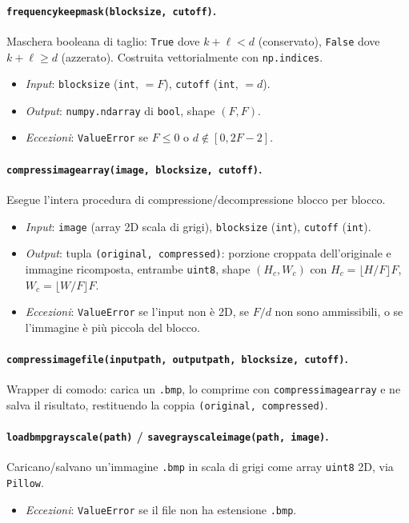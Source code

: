 \documentclass[11pt,a4paper]{article}
\makeatletter
\let\@origtexttt\texttt
\renewcommand{\texttt}[1]{{\def\_{\textunderscore\discretionary{}{}{}}\@origtexttt{#1}}}
\makeatother
\begin{document}
\paragraph{\texttt{frequency\_keep\_mask(block\_size, cutoff)}.}
Maschera booleana di taglio: \texttt{True} dove $k+\ell<d$ (conservato),
\texttt{False} dove $k+\ell\ge d$ (azzerato). Costruita vettorialmente con
\texttt{np.indices}.
\begin{itemize}
  \item \emph{Input}: \texttt{block\_size} (\texttt{int}, $=F$), \texttt{cutoff}
        (\texttt{int}, $=d$).
  \item \emph{Output}: \texttt{numpy.ndarray} di \texttt{bool}, shape $(F,F)$.
  \item \emph{Eccezioni}: \texttt{ValueError} se $F\le 0$ o $d\notin[0,2F-2]$.
\end{itemize}

\paragraph{\texttt{compress\_image\_array(image, block\_size, cutoff)}.}
Esegue l'intera procedura di compressione/decompressione blocco per blocco.
\begin{itemize}
  \item \emph{Input}: \texttt{image} (array 2D scala di grigi), \texttt{block\_size}
        (\texttt{int}), \texttt{cutoff} (\texttt{int}).
  \item \emph{Output}: tupla \texttt{(original, compressed)}: porzione
        croppata dell'originale e immagine ricomposta, entrambe \texttt{uint8},
        shape $(H_c,W_c)$ con $H_c=\lfloor H/F\rfloor F$, $W_c=\lfloor W/F\rfloor F$.
  \item \emph{Eccezioni}: \texttt{ValueError} se l'input non è 2D, se $F/d$
        non sono ammissibili, o se l'immagine è più piccola del blocco.
\end{itemize}

\paragraph{\texttt{compress\_image\_file(input\_path, output\_path, block\_size, cutoff)}.}
Wrapper di comodo: carica un \texttt{.bmp}, lo comprime con
\texttt{compress\_image\_array} e ne salva il risultato, restituendo la coppia
\texttt{(original, compressed)}.

\paragraph{\texttt{load\_bmp\_grayscale(path)} / \texttt{save\_grayscale\_image(path, image)}.}
Caricano/salvano un'immagine \texttt{.bmp} in scala di grigi come array
\texttt{uint8} 2D, via \texttt{Pillow}.
\begin{itemize}
  \item \emph{Eccezioni}: \texttt{ValueError} se il file non ha estensione
        \texttt{.bmp}.
\end{itemize}
\end{document}
